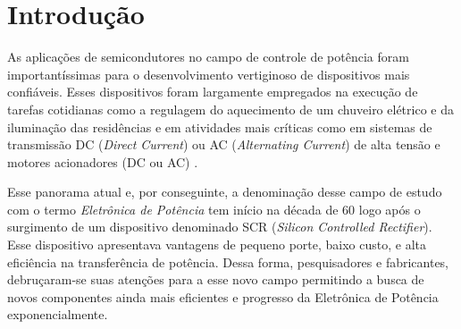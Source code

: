 \section{Introdução}

As aplicações de semicondutores no campo de controle de potência foram importantíssimas para o desenvolvimento vertiginoso de dispositivos mais confiáveis. Esses dispositivos foram largamente empregados na execução de tarefas cotidianas como a regulagem do aquecimento de um chuveiro elétrico e da iluminação das residências e em atividades mais críticas como em sistemas de transmissão DC (\textit{Direct Current}) ou AC (\textit{Alternating Current}) de alta tensão e motores acionadores (DC ou AC) \cite{ashfaq2000}.

Esse panorama atual e, por conseguinte, a denominação desse campo de estudo com o termo \textit{Eletrônica de Potência} tem início na década de 60 logo após o surgimento de um dispositivo denominado SCR (\textit{Silicon Controlled Rectifier}). Esse dispositivo apresentava vantagens de pequeno porte, baixo custo, e alta eficiência na transferência de potência. Dessa forma, pesquisadores e fabricantes, debruçaram-se suas atenções para a esse novo campo permitindo a busca de novos componentes ainda mais eficientes e progresso da Eletrônica de Potência exponencialmente.
